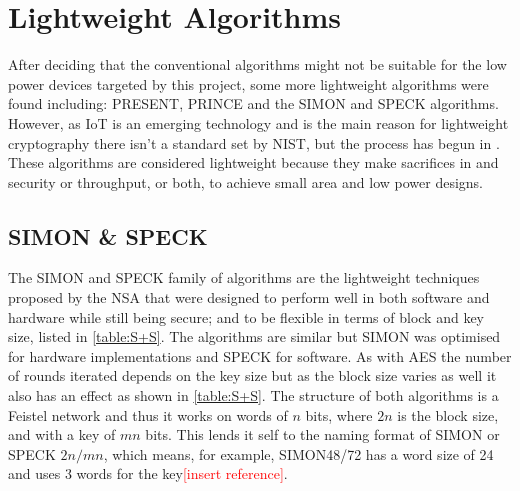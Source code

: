\documentclass[12pt,twoside,a4paper]{report}
\begin{document}
    \section{Lightweight Algorithms}
    \label{section:light}
    After deciding that the conventional algorithms might not be suitable for the low power devices targeted by this project, some more lightweight algorithms were found including: PRESENT\cite{Bogdanov2007}, PRINCE\cite{Borghoff2012} and the SIMON and SPECK algorithms\cite{Beaulieu2013}. However, as IoT is an emerging technology and is the main reason for lightweight cryptography there isn't a standard set by NIST, but the process has begun in \cite{Mckay}. These algorithms are considered lightweight because they make sacrifices in and security or throughput, or both, to achieve small area and low power designs.
    
    \subsection{SIMON \& SPECK}
    The SIMON and SPECK family of algorithms are the lightweight techniques proposed by the NSA that were designed to perform well in both software and hardware while still being secure; and to be flexible in terms of block and key size, listed in \autoref{table:S+S}. The algorithms are similar but SIMON was optimised for hardware implementations and SPECK for software. As with AES the number of rounds iterated depends on the key size but as the block size varies as well it also has an effect as shown in \autoref{table:S+S}.
    The structure of both algorithms is a Feistel network and thus it works on words of $n$ bits, where $2n$ is the block size, and with a key of $mn$ bits. This lends it self to the naming format of SIMON or SPECK $2n/mn$, which means, for example, SIMON48/72 has a word size of 24 and uses 3 words for the key\textcolor{red}{[insert reference]}.
    
\end{document}
